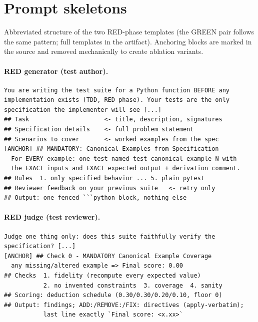 \documentclass{article}
\begin{document}
\section{Prompt skeletons}
\label{app:prompts}

Abbreviated structure of the two RED-phase templates (the GREEN pair follows the same
pattern; full templates in the artifact). Anchoring blocks are marked in the source and
removed mechanically to create ablation variants.

\paragraph{RED generator (test author).}
\begin{small}
\begin{verbatim}
You are writing the test suite for a Python function BEFORE any
implementation exists (TDD, RED phase). Your tests are the only
specification the implementer will see [...]
## Task                     <- title, description, signatures
## Specification details    <- full problem statement
## Scenarios to cover       <- worked examples from the spec
[ANCHOR] ## MANDATORY: Canonical Examples from Specification
  For EVERY example: one test named test_canonical_example_N with
  the EXACT inputs and EXACT expected output + derivation comment.
## Rules  1. only specified behavior ... 5. plain pytest
## Reviewer feedback on your previous suite   <- retry only
## Output: one fenced ```python block, nothing else
\end{verbatim}
\end{small}

\paragraph{RED judge (test reviewer).}
\begin{small}
\begin{verbatim}
Judge one thing only: does this suite faithfully verify the
specification? [...]
[ANCHOR] ## Check 0 - MANDATORY Canonical Example Coverage
  any missing/altered example => Final score: 0.00
## Checks  1. fidelity (recompute every expected value)
           2. no invented constraints  3. coverage  4. sanity
## Scoring: deduction schedule (0.30/0.30/0.20/0.10, floor 0)
## Output: findings; ADD:/REMOVE:/FIX: directives (apply-verbatim);
           last line exactly `Final score: <x.xx>`
\end{verbatim}
\end{small}
\end{document}
